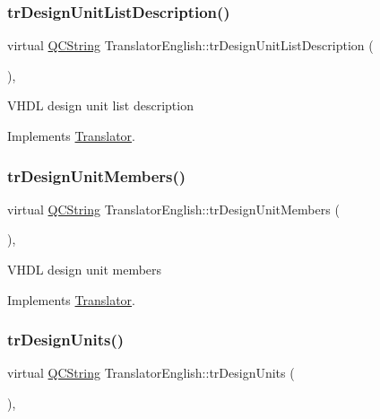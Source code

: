 \subsubsection{\texorpdfstring{trDesignUnitListDescription()}{trDesignUnitListDescription()}}
{\footnotesize\ttfamily virtual \mbox{\hyperlink{class_q_c_string}{Q\+C\+String}} Translator\+English\+::tr\+Design\+Unit\+List\+Description (\begin{DoxyParamCaption}{ }\end{DoxyParamCaption})\hspace{0.3cm}{\ttfamily [inline]}, {\ttfamily [virtual]}}

V\+H\+DL design unit list description 

Implements \mbox{\hyperlink{class_translator}{Translator}}.

\mbox{\label{class_translator_english_a10c0659806eeb84df7be7365f57faf2d}} 
\subsubsection{\texorpdfstring{trDesignUnitMembers()}{trDesignUnitMembers()}}
{\footnotesize\ttfamily virtual \mbox{\hyperlink{class_q_c_string}{Q\+C\+String}} Translator\+English\+::tr\+Design\+Unit\+Members (\begin{DoxyParamCaption}{ }\end{DoxyParamCaption})\hspace{0.3cm}{\ttfamily [inline]}, {\ttfamily [virtual]}}

V\+H\+DL design unit members 

Implements \mbox{\hyperlink{class_translator}{Translator}}.

\mbox{\label{class_translator_english_ae50b1a43eeba9d331b2508b576ae2454}} 
\subsubsection{\texorpdfstring{trDesignUnits()}{trDesignUnits()}}
{\footnotesize\ttfamily virtual \mbox{\hyperlink{class_q_c_string}{Q\+C\+String}} Translator\+English\+::tr\+Design\+Units (\begin{DoxyParamCaption}{ }\end{DoxyParamCaption})\hspace{0.3cm}{\ttfamily [inline]}, {\ttfamily [virtual]}}

